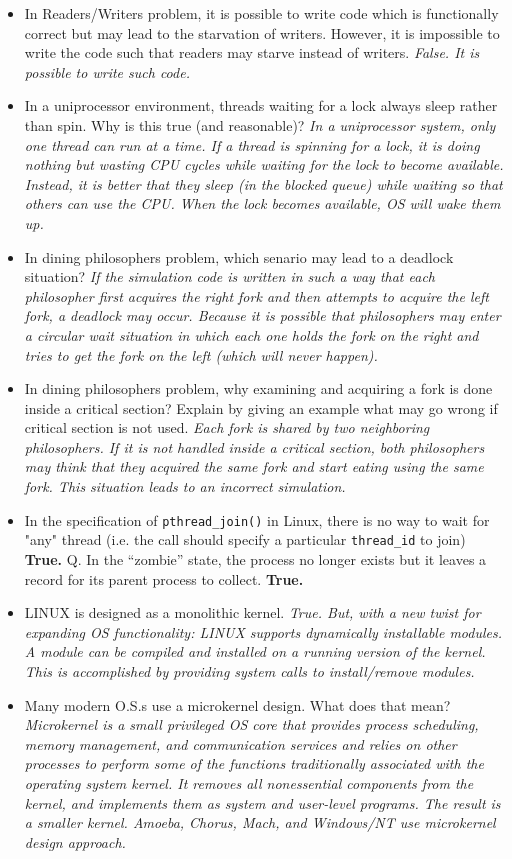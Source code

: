 \documentclass[10pt,landscape]{article}
\begin{document}
\begin{multicols}{4}
\begin{itemize}
    \item In Readers/Writers problem, it is possible to write code which is functionally correct but may lead to the starvation of writers. However, it is impossible to write the code such that readers may starve instead of writers. \textit{False. It is possible to write such code.}
    \item In a uniprocessor environment, threads waiting for a lock always sleep rather than spin. Why is this true (and reasonable)? \textit{In a uniprocessor system, only one thread can run at a time. If a thread is spinning for a lock, it is doing nothing but wasting CPU cycles while waiting for the lock to become available. Instead, it is better that they sleep (in the blocked queue) while waiting so that others can use the CPU.  When the lock becomes available, OS will wake them up.}
    \item In dining philosophers problem, which senario may lead to a deadlock situation?  \textit{If the simulation code is written in such a way that each philosopher first acquires the right fork and then attempts to acquire the left fork, a deadlock may occur. Because it is possible that philosophers may enter a circular wait situation in which each one holds the fork on the right and tries to get the fork on the left (which will never happen).}
    \item In dining philosophers problem, why examining and acquiring a fork is done inside a critical section? Explain by giving an example what may go wrong if critical section is not used.  \textit{Each fork is shared by two neighboring philosophers. If it is not handled inside a critical section, both philosophers may think that they acquired the same fork and start eating using the same fork. This situation leads to an incorrect simulation.}
    \item In the specification of \verb$pthread_join()$ in Linux, there is no way to wait for "any" thread (i.e. the call should specify a particular \verb$thread_id$ to join) \textbf{True.}
    Q. In the ``zombie'' state, the process no longer exists but it leaves a record for its parent process to collect. \textbf{True.}
    \item LINUX is designed as a monolithic kernel. \textit{True. But, with a new twist for expanding OS functionality: LINUX supports dynamically installable modules. A module can be compiled and installed on a running version of the kernel. This is accomplished by providing system calls to install/remove modules.}
    \item Many modern O.S.s use a microkernel design.  What does that mean? \textit{Microkernel is a small privileged OS core that provides process scheduling, memory management, and communication services and relies on other processes to perform some of the functions traditionally associated with the operating system kernel. It removes all nonessential components from the kernel, and implements them as system and user-level programs. The result is a smaller kernel. Amoeba, Chorus, Mach, and Windows/NT use microkernel design approach.}

\end{itemize}
\end{multicols}
\end{document}
